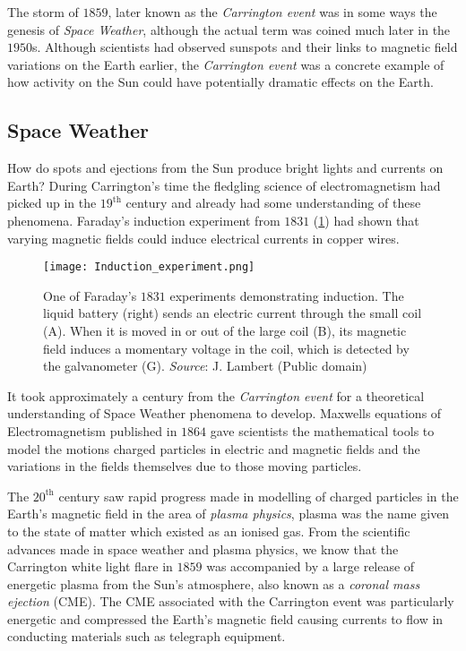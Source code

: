 The storm of $1859$, later known as the \emph{Carrington event} was in some ways the genesis of 
\emph{Space Weather}, although the actual term was coined much later in the $1950$s. Although 
scientists had observed sunspots and their links to magnetic field variations on the Earth earlier, 
the \emph{Carrington event} was a concrete example of how activity on the Sun could have 
potentially dramatic effects on the Earth.

\subsection*{Space Weather}

How do spots and ejections from the Sun produce bright lights and currents on Earth? During 
Carrington's time the fledgling science of electromagnetism had picked up in the $19^{\text{th}}$ 
century and already had some understanding of these phenomena. Faraday's induction experiment from 
$1831$ (\cref{fig:induction}) had shown that varying magnetic fields could induce electrical 
currents in copper wires.

\begin{figure}
    \noindent\centering\texttt{[image: Induction\_experiment.png]}
    \caption{
        {\small
            One of Faraday's $1831$ experiments demonstrating induction. 
            The liquid battery (right) sends an electric current through the small coil (A). 
            When it is moved in or out of the large coil (B), its magnetic field induces a 
            momentary voltage in the coil, which is detected by the galvanometer (G). 
            \textit{Source}: J. Lambert (Public domain)
        }
    }
    \label{fig:induction}
\end{figure}

It took approximately a century from the \emph{Carrington event} for a theoretical understanding of 
Space Weather phenomena to develop. Maxwells equations of Electromagnetism \citep{maxwell1865viii} 
published in $1864$ gave scientists the mathematical tools to model the motions charged particles 
in electric and magnetic fields and the variations in the fields themselves due to those moving 
particles.

The $20^{\text{th}}$ century saw rapid progress made in modelling of charged particles in the 
Earth's magnetic field in the area of \emph{plasma physics}, plasma was the name given to the state 
of matter which existed as an ionised gas. From the scientific advances made in space weather and 
plasma physics, we know that the Carrington white light flare in $1859$ was accompanied by a large 
release of energetic plasma from the Sun's atmosphere, also known as a \emph{coronal mass ejection} 
(CME). The CME associated with the Carrington event was particularly energetic and compressed the 
Earth's magnetic field causing currents to flow in conducting materials such as telegraph equipment. 

